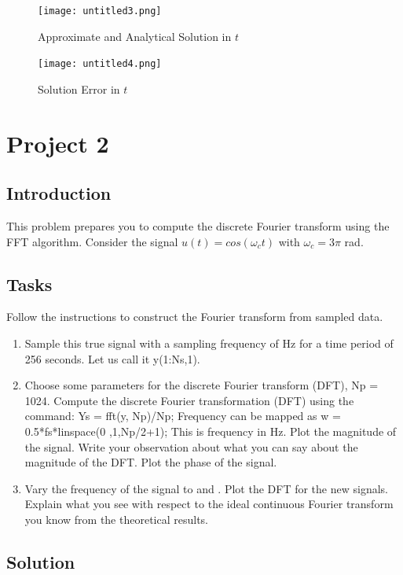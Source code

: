 \documentclass{article}
\begin{document}
\begin{figure}[h]
    \centering
    \texttt{[image: untitled3.png]}
    \caption{Approximate and Analytical Solution in $t$}
    \label{fig:enter-label}
\end{figure}

\begin{figure}[h]
    \centering
    \texttt{[image: untitled4.png]}
    \caption{Solution Error in $t$}
    \label{fig:enter-label}
\end{figure}

\clearpage
\section{Project 2}
\subsection{Introduction}
This problem prepares you to compute the discrete Fourier transform using the FFT algorithm. Consider the signal $u(t) = cos(\omega_c t)$ with $\omega_c=3\pi$ rad.

\subsection{Tasks}
Follow the instructions to construct the Fourier transform from sampled data.

\begin{enumerate}
    \item Sample this true signal with a sampling frequency of Hz for a time period of 256 seconds. Let us call it y(1:Ns,1).
    \item Choose some parameters for the discrete Fourier transform (DFT), Np = 1024. Compute the discrete Fourier transformation (DFT) using the command: Ys = fft(y, Np)/Np; Frequency can be mapped as w = 0.5*fs*linspace(0 ,1,Np/2+1); This is frequency in Hz. Plot the magnitude of the signal. Write your observation about what you can say about the magnitude of the DFT. Plot the phase of the signal.
    \item Vary the frequency of the signal to and . Plot the DFT for the new signals. Explain what you see with respect to the ideal continuous Fourier transform you know from the theoretical results.
\end{enumerate}

\subsection{Solution}
\end{document}
